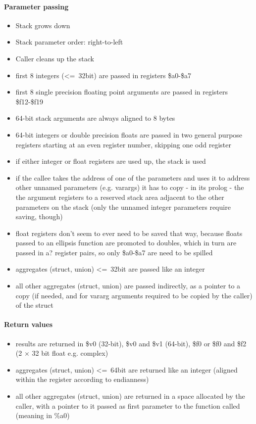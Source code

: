 \paragraph{Parameter passing}

\begin{itemize}
\item Stack grows down
\item Stack parameter order: right-to-left
\item Caller cleans up the stack
\item first 8 integers (\textless=\ 32bit) are passed in registers \$a0-\$a7
\item first 8 single precision floating point arguments are passed in registers \$f12-\$f19
\item 64-bit stack arguments are always aligned to 8 bytes
\item 64-bit integers or double precision floats are passed in two general purpose registers starting at an even register number, skipping one odd register
\item if either integer or float registers are used up, the stack is used
\item if the callee takes the address of one of the parameters and uses it to address other unnamed parameters (e.g. varargs) it has to copy - in its prolog - the the argument registers to a reserved stack area adjacent to the other parameters on the stack (only the unnamed integer parameters require saving, though) %
\item float registers don't seem to ever need to be saved that way, because floats passed to an ellipsis function are promoted to doubles, which in turn are passed in a? register pairs, so only \$a0-\$a7 are need to be spilled
\item aggregates (struct, union) \textless=\ 32bit are passed like an integer
\item all other aggregates (struct, union) are passed indirectly, as a pointer to a copy (if needed, and for vararg arguments required to be copied by the caller) of the struct
\end{itemize}

\paragraph{Return values}

\begin{itemize}
\item results are returned in \$v0 (32-bit), \$v0 and \$v1 (64-bit), \$f0 or \$f0 and \$f2 (2 $\times$ 32 bit float e.g. complex)
\item aggregates (struct, union) \textless=\ 64bit are returned like an integer (aligned within the register according to endianness)
\item all other aggregates (struct, union) are returned in a space allocated by the caller, with a pointer to it
passed as first parameter to the function called (meaning in \%a0)
\end{itemize}


